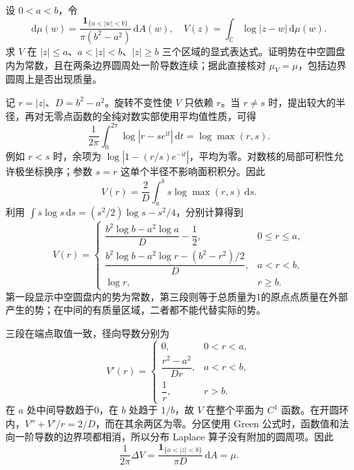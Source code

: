 \begin{exercise}[均匀圆环的对数势]\label{b3:ex:15-draft-05}
设 \(0<a<b\)，令
\[
 \mathrm d\mu(w)=\frac{\mathbf1_{\{a<|w|<b\}}}{\pi(b^2-a^2)}\,\mathrm dA(w),\quad
 V(z)=\int_{\mathbb C}\log|z-w|\,\mathrm d\mu(w).
\]
求 \(V\) 在 \(|z|\le a\)、\(a<|z|<b\)、\(|z|\ge b\) 三个区域的显式表达式。证明势在中空圆盘内为常数，且在两条边界圆周处一阶导数连续；据此直接核对 \(\mu_V=\mu\)，包括边界圆周上是否出现质量。
\end{exercise}
\begin{solution}
记 \(r=|z|\)、\(D=b^2-a^2\)。旋转不变性使 \(V\) 只依赖 \(r\)。当 \(r\ne s\) 时，提出较大的半径，再对无零点函数的全纯对数实部使用平均值性质，可得
\[
 \frac1{2\pi}\int_0^{2\pi}\log|r-se^{\mathrm it}|\,\mathrm dt
 =\log\max(r,s).
\]
例如 \(r<s\) 时，余项为 \(\log|1-(r/s)e^{-\mathrm it}|\)，平均为零。对数核的局部可积性允许极坐标换序；参数 \(s=r\) 这单个半径不影响面积积分。因此
\[
 V(r)=\frac2D\int_a^b s\log\max(r,s)\,\mathrm ds.
\]
利用 \(\int s\log s\,\mathrm ds=(s^2/2)\log s-s^2/4\)，分别计算得到
\[
 V(r)=
 \begin{cases}
 \dfrac{b^2\log b-a^2\log a}{D}-\dfrac12,&0\le r\le a,\\[6pt]
 \dfrac{b^2\log b-a^2\log r-(b^2-r^2)/2}{D},&a<r<b,\\[6pt]
 \log r,&r\ge b.
 \end{cases}
\]
第一段显示中空圆盘内的势为常数，第三段则等于总质量为1的原点点质量在外部产生的势；在中间的有质量区域，二者都不能代替实际的势。

三段在端点取值一致，径向导数分别为
\[
 V'(r)=
 \begin{cases}
 0,&0<r<a,\\[2pt]
 \dfrac{r^2-a^2}{Dr},&a<r<b,\\[6pt]
 \dfrac1r,&r>b.
 \end{cases}
\]
在 \(a\) 处中间导数趋于0，在 \(b\) 处趋于 \(1/b\)，故 \(V\) 在整个平面为 \(C^1\) 函数。在开圆环内，\(V''+V'/r=2/D\)，而在其余两区为零。分区使用 Green 公式时，函数值和法向一阶导数的边界项都相消，所以分布 Laplace 算子没有附加的圆周项。因此
\[
 \frac1{2\pi}\Delta V
 =\frac{\mathbf1_{\{a<|z|<b\}}}{\pi D}\,\mathrm dA=\mu.
\]
\end{solution}


